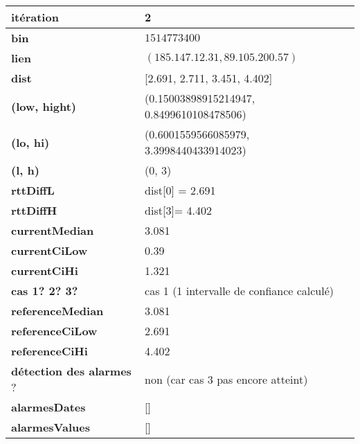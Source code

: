 	\begin{table}[H]
	\centering
	
	\begin{tabularx}{\linewidth}{|l|X| }
		\hline
		\textbf{itération} & 2	\\ \hline
		\textbf{bin} & $1514773400$ \\ \hline
		\textbf{lien} & $(185.147.12.31, 89.105.200.57)$  \\ \hline
		\textbf{dist}& [2.691, 2.711, 3.451, 4.402]	\\ \hline
		\textbf{(low, hight)}& (0.15003898915214947, 0.8499610108478506) 	\\ \hline
		\textbf{(lo, hi)}&(0.6001559566085979, 3.3998440433914023)  \\ \hline
		\textbf{(l, h)} & (0, 3) 	\\ \hline
		\textbf{rttDiffL}& dist[0] = 2.691	\\ \hline
		\textbf{rttDiffH}& dist[3]= 4.402	\\ \hline
		\textbf{currentMedian}& 3.081	\\ \hline
		\textbf{currentCiLow}&  0.39 	\\ \hline
		\textbf{currentCiHi}& 1.321	\\ \hline
	\textbf{	cas 1? 2? 3?}& cas 1 (1 intervalle de confiance calculé)  \\ \hline
		\textbf{referenceMedian}& 3.081	\\ \hline
		\textbf{referenceCiLow}& 2.691	\\ \hline
		\textbf{referenceCiHi}&4.402	\\ \hline
		\textbf{détection des alarmes} ?& non (car cas 3 pas  encore atteint)	\\ \hline
		\textbf{alarmesDates}& []	\\ \hline
		\textbf{alarmesValues}& []	\\ \hline
		
		
	\end{tabularx}
\end{table}

